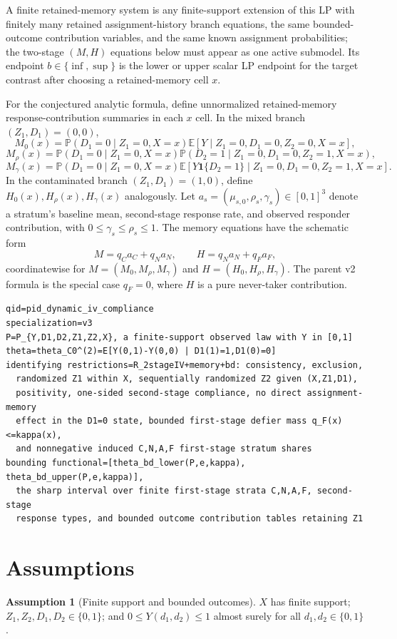 \documentclass[11pt]{article}
\newcommand{\E}{\mathbb{E}}
\renewcommand{\Pr}{\mathbb{P}}
\newcommand{\one}{\mathbf{1}}
\theoremstyle{definition}
\newtheorem{assumption}{Assumption}
\theoremstyle{plain}
\theoremstyle{remark}
\begin{document}
A finite retained-memory system is any finite-support extension of this LP with finitely many retained assignment-history branch equations, the same bounded-outcome contribution variables, and the same known assignment probabilities; the two-stage \((M,H)\) equations below must appear as one active submodel.  Its endpoint \(b\in\{\inf,\sup\}\) is the lower or upper scalar LP endpoint for the target contrast after choosing a retained-memory cell \(x\).

For the conjectured analytic formula, define unnormalized retained-memory response-contribution summaries in each \(x\) cell.  In the mixed branch \((Z_1,D_1)=(0,0)\),
\[
M_0(x)=\Pr(D_1=0\mid Z_1=0,X=x)\E[Y\mid Z_1=0,D_1=0,Z_2=0,X=x],
\]
\[
M_\rho(x)=\Pr(D_1=0\mid Z_1=0,X=x)\Pr(D_2=1\mid Z_1=0,D_1=0,Z_2=1,X=x),
\]
\[
M_\gamma(x)=\Pr(D_1=0\mid Z_1=0,X=x)
\E[Y\one\{D_2=1\}\mid Z_1=0,D_1=0,Z_2=1,X=x].
\]
In the contaminated branch \((Z_1,D_1)=(1,0)\), define \(H_0(x),H_\rho(x),H_\gamma(x)\) analogously.  Let \(a_s=(\mu_{s,0},\rho_s,\gamma_s)\in[0,1]^3\) denote a stratum's baseline mean, second-stage response rate, and observed responder contribution, with \(0\le\gamma_s\le\rho_s\le1\).  The memory equations have the schematic form
\[
M=q_C a_C+q_N a_N,\qquad H=q_N a_N+q_F a_F,
\]
coordinatewise for \(M=(M_0,M_\rho,M_\gamma)\) and \(H=(H_0,H_\rho,H_\gamma)\).  The parent v2 formula is the special case \(q_F=0\), where \(H\) is a pure never-taker contribution.

\begin{verbatim}
qid=pid_dynamic_iv_compliance
specialization=v3
P=P_{Y,D1,D2,Z1,Z2,X}, a finite-support observed law with Y in [0,1]
theta=theta_C0^(2)=E[Y(0,1)-Y(0,0) | D1(1)=1,D1(0)=0]
identifying restrictions=R_2stageIV+memory+bd: consistency, exclusion,
  randomized Z1 within X, sequentially randomized Z2 given (X,Z1,D1),
  positivity, one-sided second-stage compliance, no direct assignment-memory
  effect in the D1=0 state, bounded first-stage defier mass q_F(x)<=kappa(x),
  and nonnegative induced C,N,A,F first-stage stratum shares
bounding functional=[theta_bd_lower(P,e,kappa), theta_bd_upper(P,e,kappa)],
  the sharp interval over finite first-stage strata C,N,A,F, second-stage
  response types, and bounded outcome contribution tables retaining Z1
\end{verbatim}

\section{Assumptions}
\begin{assumption}[Finite support and bounded outcomes]\label{ass:finite-bounded}
\(X\) has finite support; \(Z_1,Z_2,D_1,D_2\in\{0,1\}\); and \(0\le Y(d_1,d_2)\le1\) almost surely for all \(d_1,d_2\in\{0,1\}\).
\end{assumption}
\end{document}
